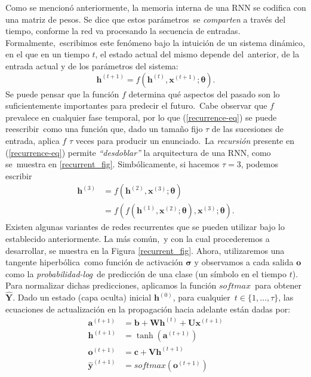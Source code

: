 \noindent
Como se mencionó anteriormente, la memoria interna de una RNN se codifica con una matriz de pesos. Se dice que estos parámetros\
se \emph{comparten} a través del tiempo, conforme la red va procesando la secuencia de entradas. Formalmente,\
escribimos este fenómeno bajo la intuición de un sistema dinámico, en el que en un tiempo $t$, el estado actual del mismo depende del\
anterior, de la entrada actual y de los parámetros del sistema:
\begin{equation} \label{recurrence-eq}
  \mathbf{h}^{(t+1)} = f(\mathbf{h}^{(t)}, \mathbf{x}^{(t+1)}; \mathbf{\theta}).
\end{equation}
Se puede pensar que la función $f$ determina qué aspectos del pasado son lo suficientemente importantes para predecir el futuro.\
Cabe observar que $f$ prevalece en cualquier fase temporal, por lo que (\ref{recurrence-eq}) se puede reescribir\
como una función que, dado un tamaño fijo $\tau$ de las sucesiones de entrada, aplica $f$ $\tau$ veces para producir un enunciado.\
La \emph{recursión} presente en (\ref{recurrence-eq}) permite \emph{``desdoblar''} la arquitectura de una RNN, como se\
muestra en \ref{recurrent_fig}. Simbólicamente, si hacemos $\tau = 3$, podemos escribir
\begin{align}
  \mathbf{h}^{(3)} &= f(\mathbf{h}^{(2)}, \mathbf{x}^{(3)}; \mathbf{\theta})\\
  &= f(f(\mathbf{h}^{(1)}, \mathbf{x}^{(2)}; \mathbf{\theta}), \mathbf{x}^{(3)}; \mathbf{\theta}).
\end{align}
Existen algunas variantes de redes recurrentes que se pueden utilizar bajo lo establecido anteriormente. La más común,\
y con la cual procederemos a desarrollar, se muestra en la Figura \ref{recurrent_fig}. Ahora, utilizaremos una tangente hiperbólica\
como función de activación $\mathbf{\sigma}$ y observamos a cada salida $\mathbf{o}$ como la \emph{probabilidad-log}\
de predicción de una clase (un símbolo en el tiempo $t$). Para normalizar dichas predicciones, aplicamos la función $softmax$\
para obtener $\mathbf{\hat{Y}}$. Dado un estado (capa oculta) inicial $\mathbf{h}^{(0)}$, para cualquier\
$t \in \{1,\ldots,\tau\}$, las ecuaciones de actualización en la propagación hacia adelante están dadas por:
\begin{align} \label{rnn-feed-forward}
  \mathbf{a}^{(t+1)} &= \mathbf{b} + \mathbf{W}\mathbf{h}^{(t)} + \mathbf{U}\mathbf{x}^{(t+1)}\\
  \mathbf{h}^{(t+1)} &= \tanh(\mathbf{a}^{(t+1)})\\
  \mathbf{o}^{(t+1)} &= \mathbf{c} + \mathbf{V}\mathbf{h}^{(t+1)}\\
  \mathbf{\hat{y}}^{(t+1)} &= softmax(\mathbf{o}^{(t+1)}) \label{rnn-y}
\end{align}
